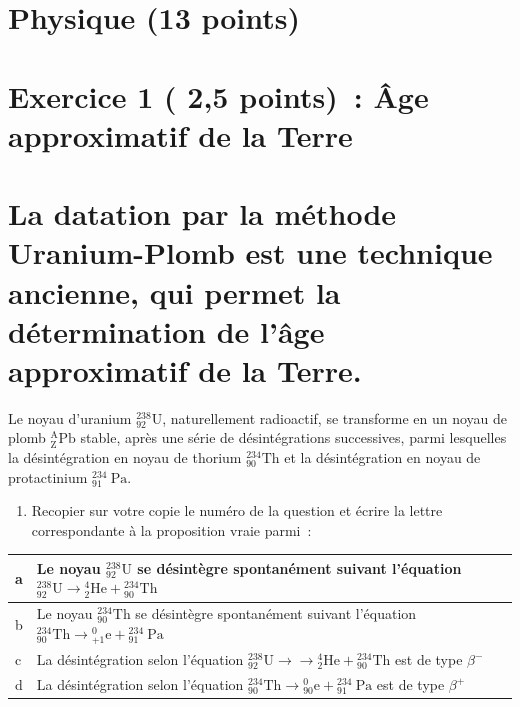 \section*{Physique (13 points)}
\section*{Exercice 1 ( 2,5 points)~: Âge approximatif de la Terre}
\section*{La datation par la méthode Uranium-Plomb est une technique ancienne, qui permet la détermination de l'âge approximatif de la Terre.}
Le noyau d'uranium ${ }_{92}^{238} \mathrm{U}$, naturellement radioactif, se transforme en un noyau de plomb ${ }_{\mathrm{Z}}^{\mathrm{A}} \mathrm{Pb}$ stable, après une série de désintégrations successives, parmi lesquelles la désintégration en noyau de thorium ${ }_{90}^{234} \mathrm{Th}$ et la désintégration en noyau de protactinium ${ }_{91}^{234} \mathrm{~Pa}$.

\begin{enumerate}
  \item Recopier sur votre copie le numéro de la question et écrire la lettre correspondante à la proposition vraie parmi~:
\end{enumerate}

\begin{center}
\begin{tabular}{|l|l|}
\hline
a & Le noyau ${ }_{92}^{238} \mathrm{U}$ se désintègre spontanément suivant l'équation ${ }_{92}^{238} \mathrm{U} \longrightarrow{ }_{2}^{4} \mathrm{He}+{ }_{90}^{234} \mathrm{Th}$ \\
\hline
b & Le noyau ${ }_{90}^{234} \mathrm{Th}$ se désintègre spontanément suivant l'équation ${ }_{90}^{234} \mathrm{Th} \longrightarrow{ }_{+1}^{0} \mathrm{e}+{ }_{91}^{234} \mathrm{~Pa}$ \\
\hline
c & La désintégration selon l'équation ${ }_{92}^{238} \mathrm{U} \longrightarrow \longrightarrow{ }_{2}^{4} \mathrm{He}+{ }_{90}^{234} \mathrm{Th}$ est de type $\beta^{-}$ \\
\hline
d & La désintégration selon l'équation ${ }_{90}^{234} \mathrm{Th} \longrightarrow{ }_{90}^{0} \mathrm{e}+{ }_{91}^{234} \mathrm{~Pa}$ est de type $\beta^{+}$ \\
\hline
\end{tabular}
\end{center}


